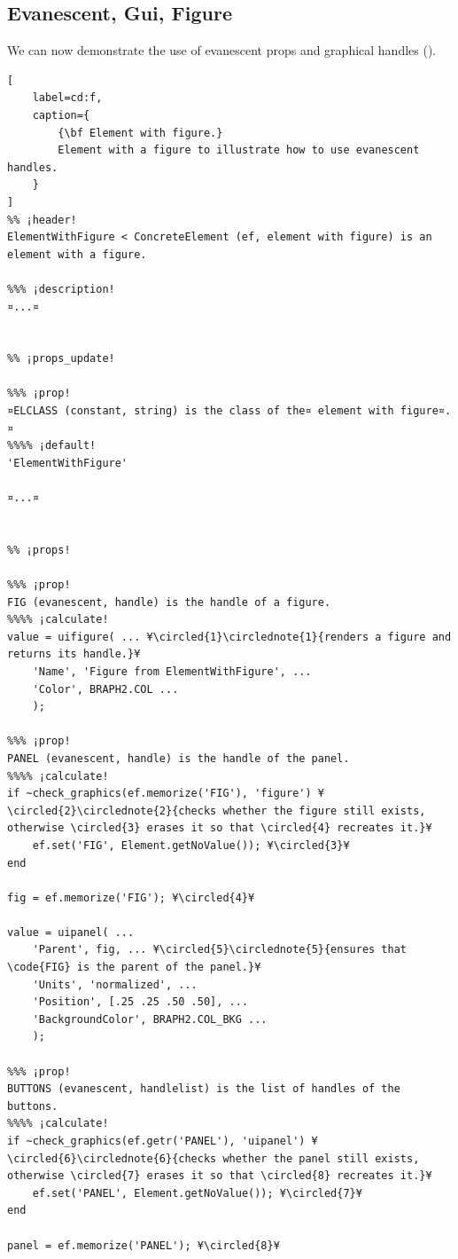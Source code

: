 \documentclass{tufte-handout}
\begin{document}
\subsection{Evanescent, Gui, Figure}

We can now demonstrate the use of evanescent props and graphical handles ().

\begin{lstlisting}[
	label=cd:f,
	caption={
		{\bf Element with figure.}
		Element with a figure to illustrate how to use evanescent handles.
	}
]
%% ¡header!
ElementWithFigure < ConcreteElement (ef, element with figure) is an element with a figure.

%%% ¡description!
¤...¤


%% ¡props_update!

%%% ¡prop!
¤ELCLASS (constant, string) is the class of the¤ element with figure¤.¤
%%%% ¡default!
'ElementWithFigure'

¤...¤


%% ¡props!

%%% ¡prop!
FIG (evanescent, handle) is the handle of a figure.
%%%% ¡calculate!
value = uifigure( ... ¥\circled{1}\circlednote{1}{renders a figure and returns its handle.}¥
    'Name', 'Figure from ElementWithFigure', ...
    'Color', BRAPH2.COL ...
    );

%%% ¡prop!
PANEL (evanescent, handle) is the handle of the panel.
%%%% ¡calculate!
if ~check_graphics(ef.memorize('FIG'), 'figure') ¥\circled{2}\circlednote{2}{checks whether the figure still exists, otherwise \circled{3} erases it so that \circled{4} recreates it.}¥
    ef.set('FIG', Element.getNoValue()); ¥\circled{3}¥
end

fig = ef.memorize('FIG'); ¥\circled{4}¥

value = uipanel( ...
    'Parent', fig, ... ¥\circled{5}\circlednote{5}{ensures that \code{FIG} is the parent of the panel.}¥
    'Units', 'normalized', ...
    'Position', [.25 .25 .50 .50], ...
    'BackgroundColor', BRAPH2.COL_BKG ...
    );

%%% ¡prop!
BUTTONS (evanescent, handlelist) is the list of handles of the buttons.
%%%% ¡calculate!
if ~check_graphics(ef.getr('PANEL'), 'uipanel') ¥\circled{6}\circlednote{6}{checks whether the panel still exists, otherwise \circled{7} erases it so that \circled{8} recreates it.}¥
    ef.set('PANEL', Element.getNoValue()); ¥\circled{7}¥
end

panel = ef.memorize('PANEL'); ¥\circled{8}¥


\end{lstlisting}
\end{document}

